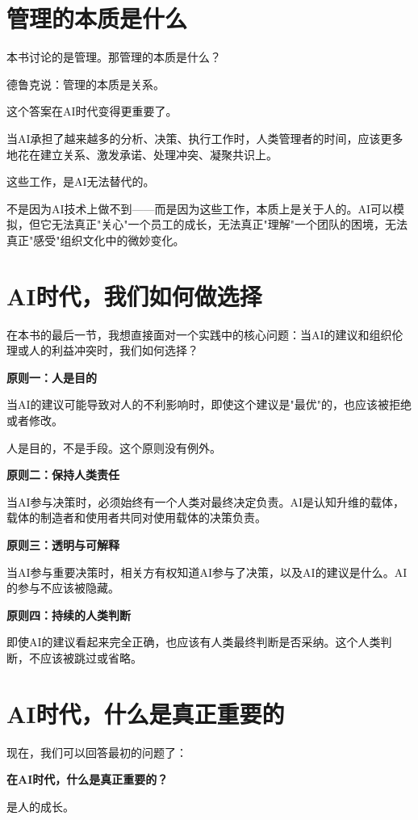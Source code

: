 \section{管理的本质是什么}


本书讨论的是管理。那管理的本质是什么？

德鲁克说：管理的本质是关系。

这个答案在AI时代变得更重要了。

当AI承担了越来越多的分析、决策、执行工作时，人类管理者的时间，应该更多地花在建立关系、激发承诺、处理冲突、凝聚共识上。

这些工作，是AI无法替代的。

不是因为AI技术上做不到——而是因为这些工作，本质上是关于人的。AI可以模拟，但它无法真正"关心"一个员工的成长，无法真正"理解"一个团队的困境，无法真正"感受"组织文化中的微妙变化。

\section{AI时代，我们如何做选择}


在本书的最后一节，我想直接面对一个实践中的核心问题：当AI的建议和组织伦理或人的利益冲突时，我们如何选择？

\textbf{原则一：人是目的}

当AI的建议可能导致对人的不利影响时，即使这个建议是"最优"的，也应该被拒绝或者修改。

人是目的，不是手段。这个原则没有例外。

\textbf{原则二：保持人类责任}

当AI参与决策时，必须始终有一个人类对最终决定负责。AI是认知升维的载体，载体的制造者和使用者共同对使用载体的决策负责。

\textbf{原则三：透明与可解释}

当AI参与重要决策时，相关方有权知道AI参与了决策，以及AI的建议是什么。AI的参与不应该被隐藏。

\textbf{原则四：持续的人类判断}

即使AI的建议看起来完全正确，也应该有人类最终判断是否采纳。这个人类判断，不应该被跳过或省略。

\section{AI时代，什么是真正重要的}


现在，我们可以回答最初的问题了：

\textbf{在AI时代，什么是真正重要的？}

是人的成长。

